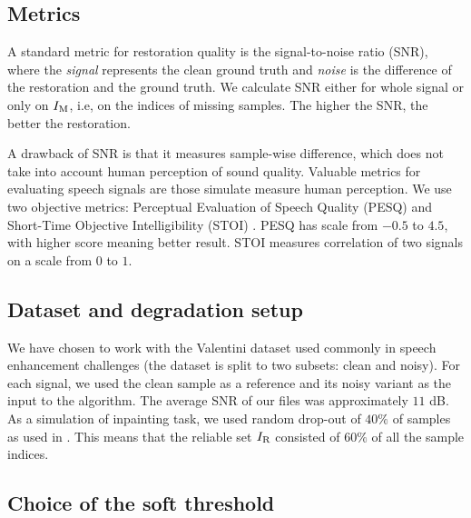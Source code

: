 \documentclass[conference]{IEEEtran}
\newcommand{\todo}[1]{\textcolor{red}{#1}}
\begin{document}
\subsection{Metrics}\label{subsec:metrics}


A standard metric for restoration quality is the signal-to-noise ratio (SNR), where the \textit{signal} represents the clean ground truth and \textit{noise} is the difference of the restoration and the ground truth.
We calculate SNR either for whole signal or only on $I_\textup{M}$, i.e, on the indices of missing samples.
The higher the SNR, the better the restoration.

A drawback of SNR is that it measures sample-wise difference, which does not take into account human perception of sound quality.
Valuable metrics for evaluating speech signals are those simulate measure human perception.
We use two objective metrics: Perceptual Evaluation of Speech Quality (PESQ) \cite{Rix2001} and 
Short-Time Objective Intelligibility (STOI) \cite{Taal2010}.
PESQ has scale from $-0.5$ to $4.5$, with higher score meaning better result.
STOI measures correlation of two signals on a scale from $0$ to $1$.

\subsection{Dataset and degradation setup}
We have chosen to work with
the Valentini dataset \cite{ValentiniBotinhao2017} used commonly in speech enhancement challenges (the dataset is split to two subsets: clean and noisy).
For each signal, we used the clean sample as a reference and its noisy variant as the input to the algorithm. %
The average SNR of our files was approximately $11$ dB.
As a simulation of inpainting task, we used random drop-out of %
$40\%$ of samples as used in \cite{Mokry2021}.
This means that the reliable set $I_\textup{R}$ consisted of $60\%$ of all the sample indices.

\subsection{Choice of the soft threshold}\label{subsec:soft_thresh}
\end{document}
